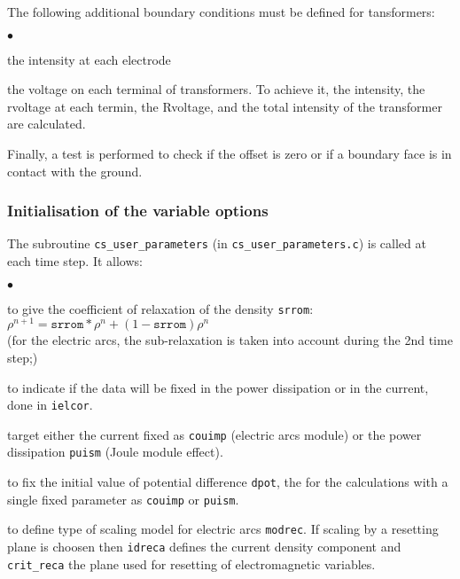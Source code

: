 {{{

The following additional boundary conditions must be defined for tansformers:
\begin{list}{$\bullet$}{}
\item  the intensity at each electrode
\item  the voltage on each terminal of transformers. To achieve it, the intensity,
 the rvoltage at each termin, the Rvoltage, and the total intensity of the
transformer are calculated.
\end{list}

Finally, a test is performed to check if the offset is zero or if a boundary
 face is in contact with the ground.

\subsubsection {Initialisation of the variable options}
\label{prg_cs_user_parameters}%

The subroutine \texttt{cs\_user\_parameters} (in \texttt{cs\_user\_parameters.c})
 is called at each time step. It allows:
\begin{list}{$\bullet$}{}
\item to give the coefficient of relaxation of the density \texttt{srrom}:\\
$\rho^{n+1}=\texttt{srrom}*\rho^{n}+(1-\texttt{srrom})\rho^{n}$\\
(for the electric arcs, the sub-relaxation is taken into account during the 2nd time
 step;)

\item to indicate if the data will be fixed in the power dissipation or
 in the current, done in \texttt{ielcor}.
\item target either the current fixed as \texttt{couimp} (electric arcs module)
 or the power dissipation \texttt{puism} (Joule module effect).
\item to fix the initial value of potential difference \texttt{dpot},
 the for the calculations with a single fixed parameter as \texttt{couimp}
 or \texttt{puism}.
\item to define type of scaling model for electric arcs \texttt{modrec}. If scaling
by a resetting plane is choosen then \texttt{idreca} defines the current density component
and \texttt{crit\_reca} the plane used for resetting of electromagnetic variables.
\end{list}

}}}
